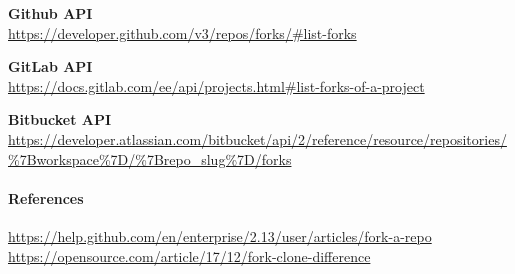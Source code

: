 \textbf{Github API}\\
\url{https://developer.github.com/v3/repos/forks/\#list-forks}

\textbf{GitLab API}\\
\url{https://docs.gitlab.com/ee/api/projects.html\#list-forks-of-a-project}

\textbf{Bitbucket API}\\
\url{https://developer.atlassian.com/bitbucket/api/2/reference/resource/repositories/\%7Bworkspace\%7D/\%7Brepo_slug\%7D/forks}

\hypertarget{references}{%
\paragraph{References}\label{references}}

\url{https://help.github.com/en/enterprise/2.13/user/articles/fork-a-repo}
\url{https://opensource.com/article/17/12/fork-clone-difference}
